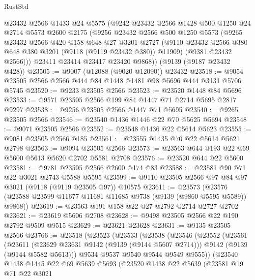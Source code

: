\begin{lexlean}{RustStd}
\begin{coremodule}
      @23432
      @2566
      @1433
      @24
      @5575
      (@9242
        @23432
        @2566
        @1428
        @500
        @1250
        @24
        @2714
        @5573
        @2600
        @2175
        (@9256
          @23432
          @2566
          @500
          @1250
          @5573
          (@9265
            @23432
            @2566
            @420
            @158
            @648
            @27
            @3201
            @2727
            (@9110 @23432 @2566 @380 @648 @380 @3201 (@9118 (@9119 @23432 @380)) @11909)
            (@9381 @23432 @2566)))
        @23411
        @23414
        @23417
        @23420
        @9868))
    (@9139 (@9187 @23432 @428))
@23505 := @9007 (@12088 (@9020 @12090)) @23432
@23518 := @9054 @23505 @2566 @2566 @444 @84 @1448 @1481 @98 @5696 @444 @3131 @5706 @5745
@23520 := @9233 @23505 @2566
@23523 := @23520 @1448 @84 @5696
@23533 := @9571 @23505 @2566 @199 @84 @1447 @71 @2714 @5695 @2817 @9297
@23538 := @9256 @23505 @2566 @1447 @71 @5695
@23540 := @9265 @23505 @2566
@23546 := @23540 @1436 @1446 @22 @70 @5625 @5694
@23548 := @9071 @23505 @2566
@23552 := @23548 @1436 @22 @5614 @5623
@23555 := @9081 @23505 @2566 @185
@23561 := @23555 @1435 @70 @22 @5614 @5621 @2798
@23563 := @9094 @23505 @2566
@23573 := @23563 @644 @193 @22 @69 @5600 @5613 @5620 @2702 @5581 @2708
@23576 := @23520 @644 @22 @5600
@23581 := @9781 @23505 @2566 @2600 @174 @83
@23588 := @23581 @90 @71 @22 @3021 @2743 @5588 @5595
@23599 := @9110 @23505 @2566 @97 @84 @97 @3021 (@9118 (@9119 @23505 @97)) @10575
@23611 := @23573
    (@23576 (@23588 @23599 @11677 @11681 @11685 @9738 (@9139 (@9860 @5595 @5589)) @9868))
@23619 := @23563 @191 @158 @22 @27 @2792 @2714 @2727 @2702
@23621 := @23619 @5606 @2708
@23628 := @9498 @23505 @2566 @22 @190 @2792 @9509 @9515
@23629 := @23621 @23628
@23631 := @9135 @23505 @2566
@23766 := @23518
    (@23523
      (@23533
        (@23538
          (@23546
            (@23552
              (@23561
                (@23611
                  (@23629 @23631 @9142 (@9139 (@9144 @5607 @2714)))
                  @9142
                  (@9139 (@9144 @5582 @5613)))
                @9534
                @9537
                @9540
                @9544
                @9549
                @9555))
            (@23540
              @1438
              @1445
              @22
              @69
              @5639
              @5693
              (@23520
                @1438
                @22
                @5639
                (@23581
                  @19
                  @71
                  @22
                  @3021

\end{coremodule}
\end{lexlean}
